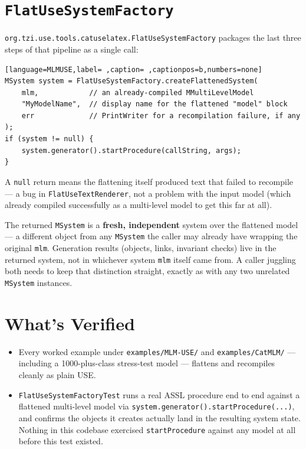 \documentclass[11pt,twoside,a4paper]{book}
\begin{document}
\section{\texttt{FlatUseSystemFactory}}
\label{sec:org11d0f00}
\texttt{org.tzi.use.tools.catuselatex.FlatUseSystemFactory} packages the last
three steps of that pipeline as a single call:

\begin{lstlisting}[language=MLMUSE,label= ,caption= ,captionpos=b,numbers=none]
MSystem system = FlatUseSystemFactory.createFlattenedSystem(
    mlm,            // an already-compiled MMultiLevelModel
    "MyModelName",  // display name for the flattened "model" block
    err             // PrintWriter for a recompilation failure, if any
);
if (system != null) {
    system.generator().startProcedure(callString, args);
}
\end{lstlisting}

A \texttt{null} return means the flattening itself produced text that failed
to recompile --- a bug in \texttt{FlatUseTextRenderer}, not a problem with the
input model (which already compiled successfully as a multi-level
model to get this far at all).

The returned \texttt{MSystem} is a \textbf{fresh, independent} system over the
flattened model --- a different object from any \texttt{MSystem} the caller
may already have wrapping the original \texttt{mlm}. Generation results
(objects, links, invariant checks) live in the returned system, not in
whichever system \texttt{mlm} itself came from. A caller juggling both needs
to keep that distinction straight, exactly as with any two unrelated
\texttt{MSystem} instances.

\section{What's Verified}
\label{sec:org660c0c1}
\begin{itemize}
\item Every worked example under \texttt{examples/MLM-USE/} and \texttt{examples/CatMLM/}
--- including a 1000-plus-class stress-test model --- flattens and
recompiles cleanly as plain USE.
\item \texttt{FlatUseSystemFactoryTest} runs a real ASSL procedure end to end
against a flattened multi-level model via
\texttt{system.generator().startProcedure(...)}, and confirms the objects it
creates actually land in the resulting system state. Nothing in this
codebase exercised \texttt{startProcedure} against any model at all before
this test existed.
\end{itemize}
\end{document}
